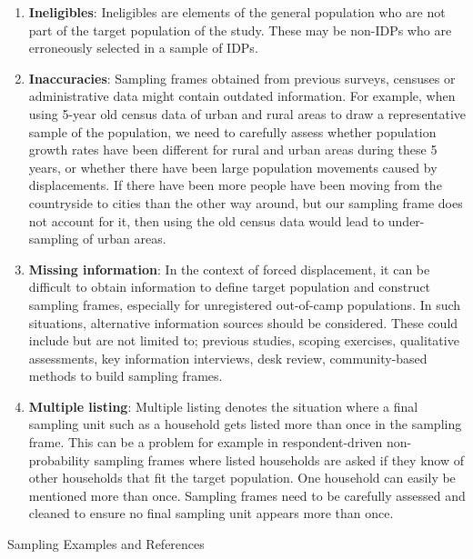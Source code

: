 \documentclass[
]{article}
\begin{document}
\begin{enumerate}
\def\labelenumi{\arabic{enumi}.}
\setcounter{enumi}{141}
\item
  \textbf{Ineligibles}: Ineligibles are elements of the general population
  who are not part of the target population of the study. These may be
  non-IDPs who are erroneously selected in a sample of IDPs.
\item
  \textbf{Inaccuracies}: Sampling frames obtained from previous surveys,
  censuses or administrative data might contain outdated information.
  For example, when using 5-year old census data of urban and rural
  areas to draw a representative sample of the population, we need to
  carefully assess whether population growth rates have been different
  for rural and urban areas during these 5 years, or whether there
  have been large population movements caused by displacements. If
  there have been more people have been moving from the countryside to
  cities than the other way around, but our sampling frame does not
  account for it, then using the old census data would lead to
  under-sampling of urban areas.
\item
  \textbf{Missing information}: In the context of forced displacement, it
  can be difficult to obtain information to define target population
  and construct sampling frames, especially for unregistered
  out-of-camp populations. In such situations, alternative information
  sources should be considered. These could include but are not
  limited to; previous studies, scoping exercises, qualitative
  assessments, key information interviews, desk review,
  community-based methods to build sampling frames.
\item
  \textbf{Multiple listing}: Multiple listing denotes the situation where
  a final sampling unit such as a household gets listed more than once
  in the sampling frame. This can be a problem for example in
  respondent-driven non-probability sampling frames where listed
  households are asked if they know of other households that fit the
  target population. One household can easily be mentioned more than
  once. Sampling frames need to be carefully assessed and cleaned to
  ensure no final sampling unit appears more than once.
\end{enumerate}

Sampling Examples and References
\end{document}
